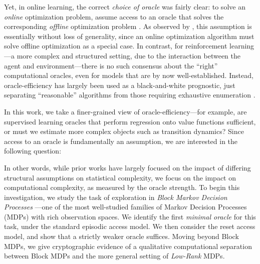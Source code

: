 Yet, in online learning, the correct \emph{choice of oracle} was fairly clear: to solve an \emph{online} optimization problem, assume access to an oracle that solves the corresponding \emph{offline} optimization problem \citep{kalai2005efficient,hazan2016computational}. As observed by \cite{kalai2005efficient}, this assumption is essentially without loss of generality, since an online optimization algorithm must solve offline optimization as a special case. In contrast, for reinforcement learning---a more complex and structured setting, due to the interaction between the agent and environment---there is no such consensus about the ``right'' computational oracles, even for models that are by now well-established. Instead, oracle-efficiency has largely been used as a black-and-white prognostic, just separating ``reasonable'' algorithms from those requiring exhaustive enumeration \citep{dann2018oracle}.

In this work, we take a finer-grained view of oracle-efficiency---for example, are supervised learning oracles that perform regression onto value functions sufficient, or must we estimate more complex objects such as transition dynamics? Since access to an oracle is fundamentally an assumption, we are interested in the following question:

In other words, while prior works have largely focused on the impact of differing structural assumptions on statistical complexity, we focus on the impact on computational complexity, as measured by the oracle strength. To begin this investigation, we study the task of exploration in \emph{Block Markov Decision Processes} \citep{du2019provably}---one of the most well-studied families of Markov Decision Processes (MDPs) with rich observation spaces. We identify the first \emph{minimal oracle} \citep{golowich2024exploration} for this task, under the standard episodic access model. We then consider the reset access model, and show that a strictly weaker oracle suffices. Moving beyond Block MDPs, we give cryptographic evidence of a qualitative computational separation between Block MDPs and the more general setting of \emph{Low-Rank} MDPs. %



